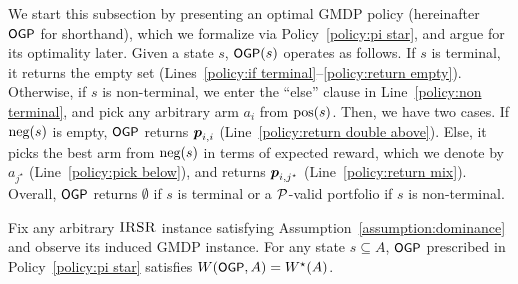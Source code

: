 We start this subsection by presenting an optimal GMDP policy (hereinafter ${\small\textnormal{\textsf{OGP}}}$ for shorthand), which we formalize via Policy~\ref{policy:pi star}, and argue for its optimality later. Given a state $s$, ${\small\textnormal{\textsf{OGP}}}(s)$ operates as follows. If $s$ is terminal, it returns the empty set (Lines~\ref{policy:if terminal}--\ref{policy:return empty}). Otherwise, if $s$ is non-terminal, we enter the ``else'' clause in Line~\ref{policy:non terminal}, and pick any arbitrary arm $a_i$ from $\textnormal{pos}(s)$. Then, we have two cases. If $\textnormal{neg}(s)$ is empty, ${\small\textnormal{\textsf{OGP}}}$ returns $\boldsymbol{ p }_{i,i}$ (Line~\ref{policy:return double above}). Else, it picks the best arm from $\textnormal{neg}(s)$ in terms of expected reward, which we denote by $a_{j^\star}$ (Line~\ref{policy:pick below}), and returns $\boldsymbol{ p }_{i,j^\star}$ (Line~\ref{policy:return mix}). Overall, ${\small\textnormal{\textsf{OGP}}}$ returns $\emptyset$ if $s$ is terminal or a $\mathcal{P}$-valid portfolio if $s$ is non-terminal.
\begin{theorem}\label{thm:optimal policy}
Fix any arbitrary $\textsc{IRSR}$ instance satisfying Assumption~\ref{assumption:dominance} and observe its induced GMDP instance. For any state $s\subseteq A$, ${\small\textnormal{\textsf{OGP}}}$ prescribed in Policy~\ref{policy:pi star} satisfies $W({\small\textnormal{\textsf{OGP}}},A)=W^{\star}(A)$.
\end{theorem}

